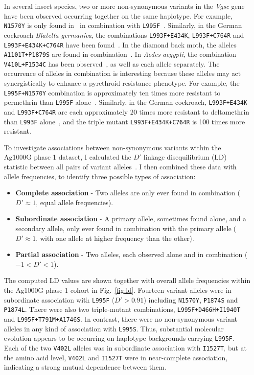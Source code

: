 \documentclass[a4paper,11pt,abstracton,hidelinks]{scrartcl}
\begin{document}
In several insect species, two or more non-synonymous variants in the \textit{Vgsc} gene have been observed occurring together on the same haplotype.
%
For example, \texttt{N1570Y} is only found in \agam\ in combination with \texttt{L995F}~\parencite{Jones2012}.
%
Similarly, in the German cockroach \textit{Blatella germanica}, the combinations \texttt{L993F+E434K}, \texttt{L993F+C764R} and \texttt{L993F+E434K+C764R} have been found~\parencite{Tan2002}.
%
In the diamond back moth, the alleles \texttt{A1101T+P1879S} are found in combination~\parencite{Sonoda2010}.
%
In \textit{Aedes aegypti}, the combination \texttt{V410L+F1534C} has been observed~\parencite{Haddi2017}, as well as each allele separately.
%
The occurrence of alleles in combination is interesting because these alleles may act synergistically to enhance a pyrethroid resistance phenotype.
%
For example, the \texttt{L995F+N1570Y} combination is approximately ten times more resistant to permethrin than \texttt{L995F} alone~\parencite{Wang2015}.
%
Similarly, in the German cockroach, \texttt{L993F+E434K} and \texttt{L993F+C764R} are each approximately 20 times more resistant to deltamethrin than \texttt{L993F} alone~\parencite{Tan2002}, and the triple mutant \texttt{L993F+E434K+C764R} is 100 times more resistant.


To investigate associations between non-synonymous variants within the Ag1000G phase 1 dataset, I calculated the $D'$ linkage disequilibrium (LD) statistic between all pairs of variant alleles~\parencite{Lewontin1964}.
%
I then combined these data with allele frequencies, to identify three possible types of association:
%
\begin{itemize}
    \item \textbf{Complete association} - Two alleles are only ever found in combination ($D' \approx 1$, equal allele frequencies).
    \item \textbf{Subordinate association} - A primary allele, sometimes found alone, and a secondary allele, only ever found in combination with the primary allele ($D' \approx 1$, with one allele at higher frequency than the other).
    \item \textbf{Partial association} - Two alleles, each observed alone and in combination ($-1 < D' < 1$).
\end{itemize}


The computed LD values are shown together with overall allele frequencies within the Ag1000G phase 1 cohort in Fig.~\ref{fig:ld}.
%
Fourteen variant alleles were in subordinate association with \texttt{L995F} ($D' > 0.91$) including \texttt{N1570Y}, \texttt{P1874S} and \texttt{P1874L}.
%
There were also two triple-mutant combinations, \texttt{L995F+D466H+I1940T} and \texttt{L995F+T791M+A1746S}.
%
In contrast, there were no non-synonymous variant alleles in any kind of association with \texttt{L995S}.
%
Thus, substantial molecular evolution appears to be occurring on haplotype backgrounds carrying \texttt{L995F}.
%
Each of the two \texttt{V402L} alleles was in subordinate association with \texttt{I1527T}, but at the amino acid level, \texttt{V402L} and \texttt{I1527T} were in near-complete association, indicating a strong mutual dependence between them.
\end{document}
